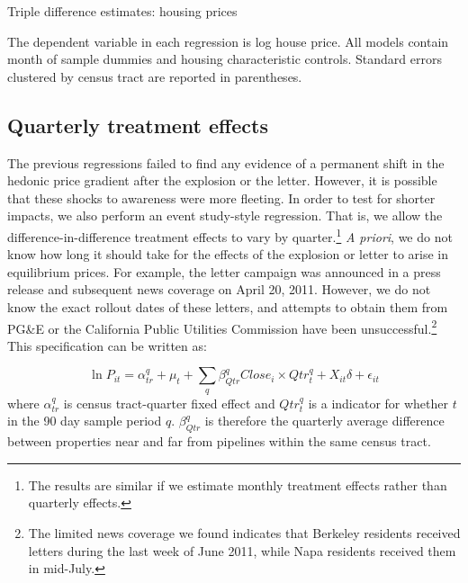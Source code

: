 \documentclass[12pt]{article}
\begin{document}
\begin{table}[H]
\caption{Triple difference estimates: housing prices\label{tab:triple_diff}}

\footnotesize
\begin{centering}

\par\end{centering}
\scriptsize

The dependent variable in each regression is log house price. All
models contain month of sample dummies and housing characteristic
controls. Standard errors clustered by census tract are reported in
parentheses. 
\end{table}

\subsection{Quarterly treatment effects}

The previous regressions failed to find any evidence of a permanent shift in the hedonic price gradient after the explosion or the letter. However, it is possible that these shocks to awareness were more fleeting. In order to test for shorter impacts, we also perform an event study-style regression. That is, we allow the difference-in-difference treatment effects to vary by quarter.\footnote{The results are similar if we estimate monthly treatment effects rather than quarterly effects.} \emph{A priori}, we do not know how long it should take for the effects of the explosion or letter to arise in equilibrium prices.\emph{ }For example, the letter campaign was announced in a press release and subsequent news coverage on April 20, 2011. However, we do not know the exact rollout dates of these letters, and attempts to obtain them from PG\&E or the California Public Utilities Commission have been unsuccessful.\footnote{The limited news coverage we found indicates that Berkeley residents received letters during the last week of June 2011, while Napa residents received them in mid-July. } This specification can be written as:

\begin{equation}
\ln P_{it}=\alpha_{tr}^{q}+\mu_{t}+\sum_{q}\beta_{Qtr}^{q}Close_{i}\times Qtr_{t}^{q}+X_{it}\delta+\epsilon_{it}\label{eq:qtr_DD}
\end{equation}
where $\alpha_{tr}^{q}$ is census tract-quarter fixed effect and
$Qtr_{t}^{q}$ is a indicator for whether $t$ in the 90 day sample
period $q$. $\beta_{Qtr}^{q}$ is therefore the quarterly average
difference between properties near and far from pipelines within the
same census tract. 
\end{document}

